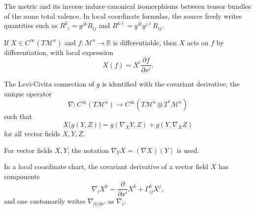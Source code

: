 \begin{remark}
\label{appa-rem-index-raising-lowering}
The metric and its inverse induce canonical isomorphisms between tensor bundles of the same total valence. In local coordinate formulas, the source freely writes quantities such as \(R^k{}_i=g^{jk}R_{ij}\) and \(R^{k\ell}=g^{ik}g^{j\ell}R_{ij}\).
\end{remark}

\begin{definition}
\label{appa-def-vector-action-on-function}
If \(X\in C^\infty(T\mathcal M^n)\) and \(f:\mathcal M^n\to \mathbb R\) is differentiable, then \(X\) acts on \(f\) by differentiation, with local expression
\[
X(f)=X^i\frac{\partial f}{\partial x^i}.
\]
\end{definition}

\begin{definition}
\label{appa-def-levi-civita-covariant-derivative}
The Levi-Civita connection of \(g\) is identified with the covariant derivative, the unique operator
\[
\nabla : C^\infty(T\mathcal M^n)\to C^\infty(T\mathcal M^n\otimes T^*\mathcal M^n)
\]
such that
\[
X\bigl(g(Y,Z)\bigr)=g(\nabla_XY,Z)+g(Y,\nabla_XZ)
\]
for all vector fields \(X,Y,Z\).
\end{definition}

\begin{remark}
\label{appa-rem-covariant-derivative-vector}
For vector fields \(X,Y\), the notation \(\nabla_YX=(\nabla X)(Y)\) is used.
\end{remark}

\begin{definition}
\label{appa-def-covariant-derivative-vector}
In a local coordinate chart, the covariant derivative of a vector field \(X\) has components
\[
\nabla_i X^k = \frac{\partial}{\partial x^i}X^k + \Gamma^k_{ij}X^j,
\]
and one customarily writes \(\nabla_{\partial/\partial x^i}\) as \(\nabla_i\).
\end{definition}

